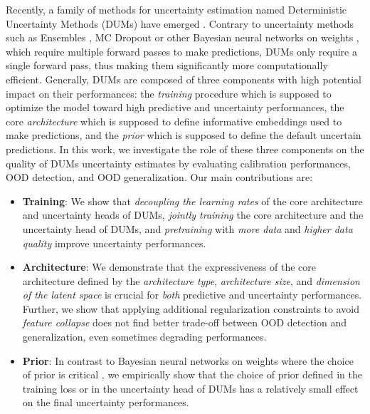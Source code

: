 Recently, a family of methods for uncertainty estimation named Deterministic Uncertainty Methods (DUMs) have emerged \citep{postels2022practicalitydum}. 
Contrary to uncertainty methods such as Ensembles \citep{ensembles}, MC Dropout \citep{dropout} or other Bayesian neural networks on weights \citep{bayesian-networks}, which require multiple forward passes to make predictions, DUMs only require a single forward pass, thus making them significantly more computationally efficient. 
Generally, DUMs are composed of three components with high potential impact on their performances: the \emph{training} procedure which is supposed to optimize the model toward high predictive and uncertainty performances,  the core \emph{architecture} which is supposed to define informative embeddings used to make predictions, and the \emph{prior} which is supposed to define the default uncertain predictions. In this work, we investigate the role of these three components on the quality of DUMs uncertainty estimates by evaluating calibration performances, OOD detection, and OOD generalization. Our main contributions are:
\vspace{-2mm}
\begin{itemize}
    \item \textbf{Training}: We show that \emph{decoupling the learning rates} of the core architecture and uncertainty heads of DUMs, \emph{jointly training} the core architecture and the uncertainty head of DUMs, and \emph{pretraining} with \emph{more data} and \emph{higher data quality} improve uncertainty performances. 
    \item \textbf{Architecture}: We demonstrate that the expressiveness of the core architecture defined by the \emph{architecture type}, \emph{architecture size}, and \emph{dimension of the latent space} is crucial for \emph{both} predictive and uncertainty performances. Further, we show that applying additional regularization constraints to avoid \emph{feature collapse} does not find better trade-off between OOD detection and generalization, even sometimes degrading performances.
    \item \textbf{Prior}: In contrast to Bayesian neural networks on weights where the choice of prior is critical \citep{bayesposterior2020wenzel, fortuin2022prior, noci2021prior_cpe, kapoor2022prior_cpe}, we empirically show that the choice of prior defined in the training loss or in the uncertainty head of DUMs has a relatively small effect on the final uncertainty performances.
\end{itemize}
